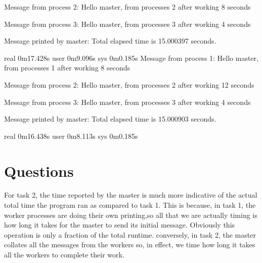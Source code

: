 \documentclass[11pt]{article}
\begin{document}
Message from process 2: Hello master, from processes 2 after working 8 seconds

Message from process 3: Hello master, from processes 3 after working 4 seconds

Message printed by master: Total elapsed time is 15.000397 seconds.

real    0m17.428s
user    0m9.096s
sys     0m0.185s
Message from process 1: Hello master, from processes 1 after working 8 seconds

Message from process 2: Hello master, from processes 2 after working 12 seconds

Message from process 3: Hello master, from processes 3 after working 4 seconds

Message printed by master: Total elapsed time is 15.000903 seconds.

real    0m16.438s
user    0m8.113s
sys     0m0.185s


\section{Questions}
\label{sec:org64dc005}
For task 2, the time reported by the master is much more indicative of the actual total time the program ran as compared to task 1. This is because, in task 1, the worker processes are doing their own printing,so all that we are actually timing is how long it takes for the master to send its initial message. Obviously this operation is only a fraction of the total runtime. conversely, in task 2, the master collates all the messages from the workers so, in effect, we time how long it takes all the workers to complete their work. 
\end{document}
